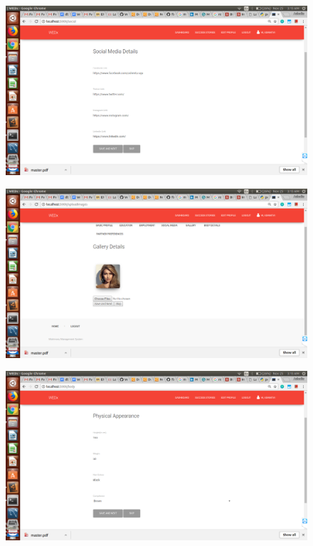 \documentclass[12pt]{report}
\begin{document}
\begin{figure}[!htb]
    \centering
    \includegraphics[width=1\textwidth]{sc-5.png}
\end{figure}

\begin{figure}[!htb]
    \centering
    \includegraphics[width=1\textwidth]{sc-6.png}
\end{figure}

\begin{figure}[!htb]
    \centering
    \includegraphics[width=1\textwidth]{sc-7.png}
\end{figure}
\end{document}

